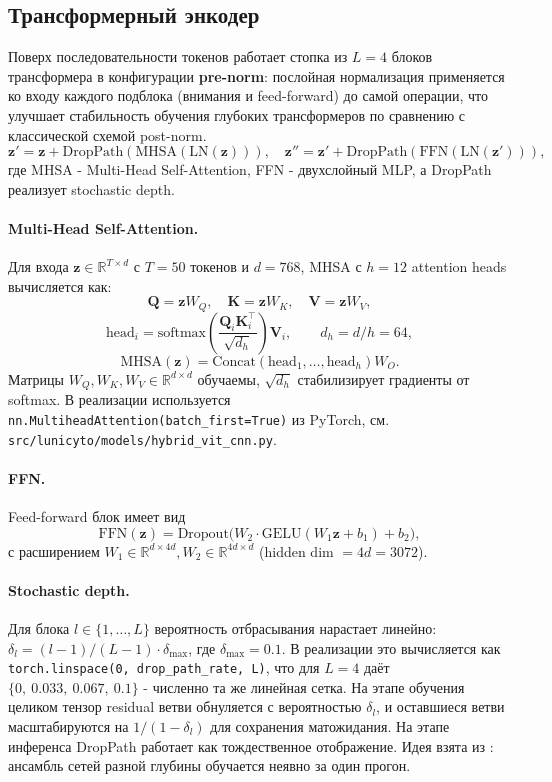 \documentclass[14pt,a4paper]{extreport}
\begin{document}
\subsection{Трансформерный энкодер}

Поверх последовательности токенов работает стопка из $L=4$ блоков
трансформера в конфигурации \textbf{pre-norm}: послойная нормализация
применяется ко входу каждого подблока (внимания и feed-forward) до самой
операции, что улучшает стабильность обучения глубоких трансформеров по
сравнению с классической схемой post-norm.
\[
    \mathbf{z}' = \mathbf{z} + \text{DropPath}(\text{MHSA}(\text{LN}(\mathbf{z}))),
    \quad
    \mathbf{z}'' = \mathbf{z}' + \text{DropPath}(\text{FFN}(\text{LN}(\mathbf{z}'))),
\]
где MHSA - Multi-Head Self-Attention, FFN - двухслойный MLP, а DropPath
реализует stochastic depth.

\paragraph{Multi-Head Self-Attention.} Для входа $\mathbf{z} \in
\mathbb{R}^{T \times d}$ с $T=50$ токенов и $d=768$, MHSA с $h=12$
attention heads вычисляется как:
\[
    \mathbf{Q} = \mathbf{z} W_Q, \quad
    \mathbf{K} = \mathbf{z} W_K, \quad
    \mathbf{V} = \mathbf{z} W_V,
\]
\[
    \text{head}_i = \text{softmax}\!\left(
        \frac{\mathbf{Q}_i \mathbf{K}_i^{\top}}{\sqrt{d_h}}
    \right) \mathbf{V}_i,
    \qquad
    d_h = d / h = 64,
\]
\[
    \text{MHSA}(\mathbf{z}) = \text{Concat}(\text{head}_1, \ldots, \text{head}_h) W_O.
\]
Матрицы $W_Q, W_K, W_V \in \mathbb{R}^{d \times d}$ обучаемы, $\sqrt{d_h}$
стабилизирует градиенты от softmax. В реализации используется
\texttt{nn.MultiheadAttention(batch\_first=True)} из PyTorch, см.
\texttt{src/lunicyto/models/hybrid\_vit\_cnn.py}.

\paragraph{FFN.} Feed-forward блок имеет вид
\[
    \text{FFN}(\mathbf{z}) = \text{Dropout}\!\Big(
        W_2 \cdot \text{GELU}(W_1 \mathbf{z} + b_1) + b_2
    \Big),
\]
с расширением $W_1 \in \mathbb{R}^{d \times 4d}, W_2 \in \mathbb{R}^{4d \times d}$
(hidden dim $= 4d = 3072$).

\paragraph{Stochastic depth.} Для блока $l \in \{1, \ldots, L\}$ вероятность
отбрасывания нарастает линейно: $\delta_l = (l-1)/(L-1) \cdot \delta_{\max}$,
где $\delta_{\max} = 0.1$. В реализации это вычисляется как
\texttt{torch.linspace(0, drop\_path\_rate, L)}, что для $L=4$ даёт
$\{0,\ 0.033,\ 0.067,\ 0.1\}$ - численно та же линейная сетка. На этапе
обучения целиком тензор residual ветви
обнуляется с вероятностью $\delta_l$, и оставшиеся ветви масштабируются на
$1/(1 - \delta_l)$ для сохранения матожидания. На этапе инференса DropPath
работает как тождественное отображение. Идея взята из
\cite{huang2016deep}: ансамбль сетей разной глубины обучается неявно за
один прогон.
\end{document}

